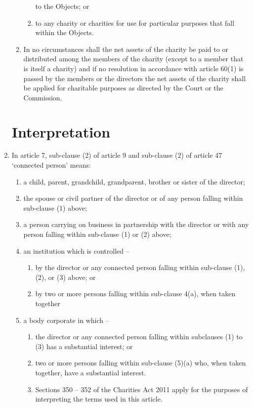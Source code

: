 \documentclass{article}
\begin{document}
\begin{enumerate}[label=\arabic*, start=23]
\begin{enumerate}[label=(\arabic*)]
\begin{enumerate}[label=(\alph*)]
            to the Objects; or
            \item to any charity or charities for use for particular purposes
            that fall within the Objects.
        \end{enumerate}
        \item In no circumstances shall the net assets of the charity be paid
        to or distributed among the members of the charity (except
        to a member that is itself a charity) and if no resolution in
        accordance with article 60(1) is passed by the members or
        the directors the net assets of the charity shall be applied for
        charitable purposes as directed by the Court or the Commission.
    \end{enumerate}
    
    \section{Interpretation}
    \item In article 7, sub-clause (2) of article 9 and sub-clause (2) of article 47
    `connected person' means:
    \begin{enumerate}[label=(\arabic*)]
        \item a child, parent, grandchild, grandparent, brother or sister of
        the director;
        \item the spouse or civil partner of the director or of any person
        falling within sub-clause (1) above;
        \item a person carrying on business in partnership with the director or
        with any person falling within sub-clause (1) or (2) above;
        \item an institution which is controlled –
        \begin{enumerate}[label=(\alph*)]
            \item by the director or any connected person falling within
            sub-clause (1), (2), or (3) above; or
            \item by two or more persons falling within sub-clause 4(a),
            when taken together
        \end{enumerate}
        \item a body corporate in which –
        \begin{enumerate}[label=(\alph*)]
            \item the director or any connected person falling within subclauses (1) to (3) has a substantial interest; or
            \item two or more persons falling within sub-clause (5)(a) who,
            when taken together, have a substantial interest.
            \item Sections 350 – 352 of the Charities Act 2011 apply for the
            purposes of interpreting the terms used in this article.
        \end{enumerate}
    \end{enumerate}
\end{enumerate}
\end{document}
